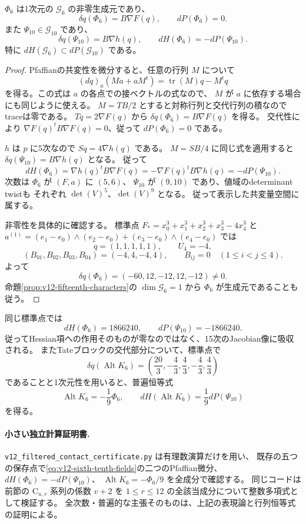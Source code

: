 \begin{lemma}
\label{lem:v12-sixth-hessian-action}
$\Phi_6$ は1次元の $\mathcal G_6$ の非零生成元であり、
\[
 \delta q(\Phi_6)=B\nabla F(q),\qquad dP(\Phi_6)=0.
\]
また $\Psi_{10}\in\mathcal G_{10}$ であり、
\[
 \delta q(\Psi_{10})=B\nabla h(q),\qquad
 dH(\Phi_6)=-dP(\Psi_{10}).
\]
特に $dH(\mathcal G_6)\subset dP(\mathcal G_{10})$ である。
\end{lemma}
\begin{proof}
Pfaffianの共変性を微分すると、任意の行列 $M$ について
\[
 (dq)_a(Ma+aM^t)=\operatorname{tr}(M)q-M^tq
\]
を得る。この式は $a$ の各点での接ベクトルの式なので、
$M$ が $a$ に依存する場合にも同じように使える。
$M=TB/2$ とすると対称行列と交代行列の積なのでtraceは零である。
$Tq=2\nabla F(q)$ から $\delta q(\Phi_6)=B\nabla F(q)$ を得る。
交代性により $\nabla F(q)^tB\nabla F(q)=0$、従って $dP(\Phi_6)=0$ である。

$h$ は $p$ に5次なので $Sq=4\nabla h(q)$ である。
$M=SB/4$ に同じ式を適用すると
$\delta q(\Psi_{10})=B\nabla h(q)$ となる。
従って
\[
 dH(\Phi_6)=\nabla h(q)^tB\nabla F(q)
 =-\nabla F(q)^tB\nabla h(q)=-dP(\Psi_{10}).
\]
次数は $\Phi_6$ が $(F,a)$ に $(5,6)$、
$\Psi_{10}$ が $(9,10)$ であり、値域のdeterminant twistも
それぞれ $\det(V)^5$、$\det(V)^9$ となる。
従って表示した共変量空間に属する。

非零性を具体的に確認する。
標準点 $F_*=x_0^3+x_1^3+x_2^3+x_3^3-4x_4^3$ と
$a^{(1)}=(e_1-e_0)\wedge(e_2-e_0)+(e_3-e_0)\wedge(e_4-e_0)$ では
\[
 q=(1,1,1,1,1),\qquad U_4=-4,
\]
\[
 (B_{01},B_{02},B_{03},B_{04})=(-4,4,-4,4),\qquad
 B_{ij}=0\quad(1\le i<j\le4).
\]
よって
\[
 \delta q(\Phi_6)=(-60,12,-12,12,-12)\ne0.
\]
命題\ref{prop:v12-fifteenth-characters}の $\dim\mathcal G_6=1$ から
$\Phi_6$ が生成元であることも従う。
\end{proof}

同じ標準点では
\[
 dH(\Phi_6)=1866240,\qquad dP(\Psi_{10})=-1866240.
\]
従ってHessian項への作用そのものが零なのではなく、15次のJacobian像に吸収される。
またTateブロックの交代部分について、標準点で
\[
 \delta q(\operatorname{Alt}K_6)
   =\left(\frac{20}{3},-\frac43,\frac43,-\frac43,\frac43\right)
\]
であることと1次元性を用いると、普遍恒等式
\[
 \operatorname{Alt}K_6=-\frac19\Phi_6,
 \qquad dH(\operatorname{Alt}K_6)=\frac19dP(\Psi_{10})
\]
を得る。

\paragraph{小さい独立計算証明書.}
\texttt{v12\_filtered\_contact\_certificate.py} は有理数演算だけを用い、
既存の五つの保存点で\eqref{eq:v12-sixth-tenth-fields}の二つのPfaffian微分、
$dH(\Phi_6)=-dP(\Psi_{10})$、
$\operatorname{Alt}K_6=-\Phi_6/9$ を全成分で確認する。
同じコードは前節の $\mathrm C_{u,v}$ 系列の係数 $v+2$ を
$1\le r\le12$ の全該当成分について整数多項式として検証する。
全次数・普遍的な主張そのものは、上記の表現論と行列恒等式の証明による。

